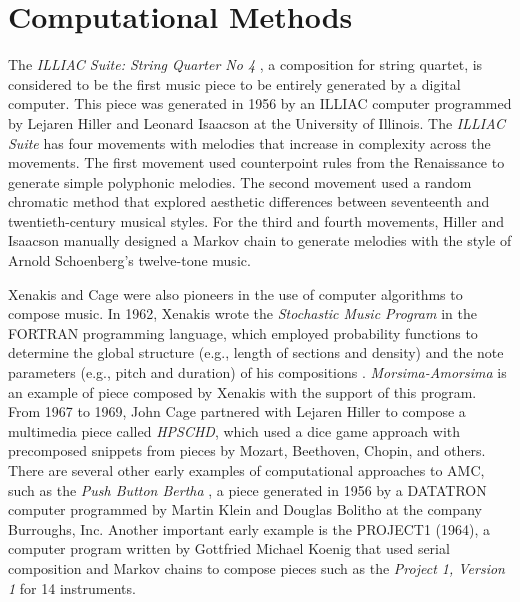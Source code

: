 \section{Computational Methods}

The \textit{ILLIAC Suite: String Quarter No 4} \cite{hiller1957musical}, a composition for string quartet, is considered to be the first music piece to be entirely generated by a digital computer. This piece was generated in 1956 by an ILLIAC computer programmed by Lejaren Hiller and Leonard Isaacson at the University of Illinois. The \textit{ILLIAC Suite} has four movements with melodies that increase in complexity across the movements. The first movement used counterpoint rules from the Renaissance to generate simple polyphonic melodies. The second movement used a random chromatic method that explored aesthetic differences between seventeenth and twentieth-century musical styles. For the third and fourth movements, Hiller and Isaacson manually designed a Markov chain to generate melodies with the style of Arnold Schoenberg's twelve-tone music.

Xenakis and Cage were also pioneers in the use of computer algorithms to compose music. In 1962, Xenakis wrote the \textit{Stochastic Music Program} in the FORTRAN programming language, which employed probability functions to determine the global structure (e.g., length of sections and density) and the note parameters (e.g., pitch and duration) of his compositions \cite{luque2009stochastic}. \textit{Morsima-Amorsima} is an example of piece composed by Xenakis with the support of this program. From 1967 to 1969, John Cage partnered with Lejaren Hiller to compose a multimedia piece called \textit{HPSCHD}, which used a dice game approach with precomposed snippets from pieces by Mozart, Beethoven, Chopin, and others. There are several other early examples of computational approaches to AMC, such as the \textit{Push Button Bertha} \cite{ames1987automated}, a piece generated in 1956 by a DATATRON computer programmed by Martin Klein and Douglas Bolitho at the company Burroughs, Inc. Another important early example is the PROJECT1 (1964), a computer program written by Gottfried Michael Koenig that used serial composition and Markov chains to compose pieces such as the \textit{Project 1, Version 1} for 14 instruments.

